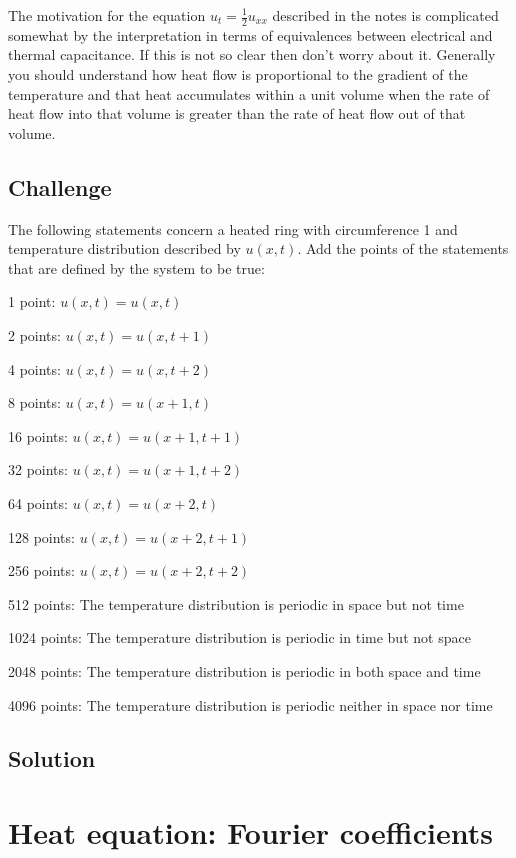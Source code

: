 The motivation for the equation $u_t = \frac{1}{2} u_{xx}$ described in the notes is complicated somewhat by the interpretation in terms of equivalences between electrical and thermal capacitance. If this is not so clear then don't worry about it. Generally you should understand how heat flow is proportional to the gradient of the temperature and that heat accumulates within a unit volume when the rate of heat flow into that volume is greater than the rate of heat flow out of that volume.

\subsection*{Challenge}
The following statements concern a heated ring with circumference 1 and temperature distribution described by $u(x,t)$. Add the points of the statements that are defined by the system to be true:

1 point: $\displaystyle u(x,t) = u(x,t)$

2 points: $\displaystyle u(x,t) = u(x,t+1)$

4 points: $\displaystyle u(x,t) = u(x,t+2)$

8 points: $\displaystyle u(x,t) = u(x+1,t)$

16 points: $\displaystyle u(x,t) = u(x+1,t+1)$

32 points: $\displaystyle u(x,t) = u(x+1,t+2)$

64 points: $\displaystyle u(x,t) = u(x+2,t)$

128 points: $\displaystyle u(x,t) = u(x+2,t+1)$

256 points: $\displaystyle u(x,t) = u(x+2,t+2)$

512 points: The temperature distribution is periodic in space but not time

1024 points: The temperature distribution is periodic in time but not space

2048 points: The temperature distribution is periodic in both space and time

4096 points: The temperature distribution is periodic neither in space nor time


\subsection*{Solution}




\newpage
\section{Heat equation: Fourier coefficients}
\label{sec:heateqnfc}

